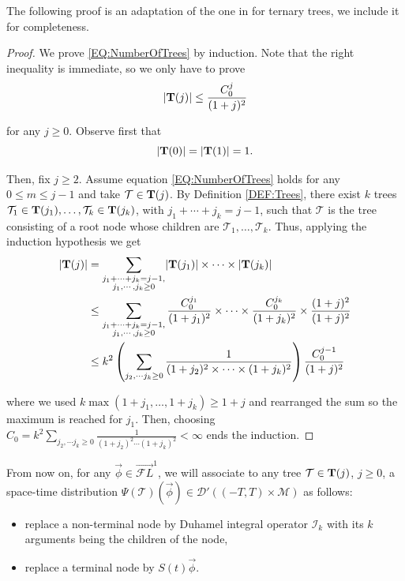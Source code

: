 \documentclass[letterpaper, 11pt,  reqno]{amsart}
\newcommand{\1}{\hspace{0.5mm}\text{I}\hspace{0.5mm}}
\newcommand{\I}{\mathcal{I}}
\newcommand{\noi}{\noindent}
\newcommand{\TT}{\mathcal{T}}
\newcommand{\BT}{{\bf T}}%
\newcommand{\M}{\mathcal{M}}
\newcommand{\FLv}{\overrightarrow{\mathcal{F}L}}
\numberwithin{equation}{section}
\numberwithin{theorem}{section}
\newcommand{\abs}[1]{\lvert#1\rvert}
\begin{document}
The following proof is an adaptation of the one in \cite{Oh} for ternary trees, we include it for completeness.

\begin{proof}
We prove \eqref{EQ:NumberOfTrees} by induction. Note that the right inequality is immediate, so we only have to prove
$$
\abs{\BT (j)} \leq \frac{C^j_0}{(1 + j)^2 }
$$

\noi for any $j \geq 0$. Observe first that
$$
\abs{\BT (0)} = \abs{\BT (1)} =1.
$$

\noi Then, fix $j \geq 2$. Assume equation \eqref{EQ:NumberOfTrees} holds for any $0 \leq m \leq j-1$ and take $\TT \in \BT(j)$. By Definition \ref{DEF:Trees}, there exist $k$ trees $\TT_1 \in \BT(j_1), \dots, \TT_k \in \BT(j_k )$, with $j_1 + \cdots + j_k = j -1$, such that $\TT$ is the tree consisting of a root node whose children are $\TT_1, \dots, \TT_k$. Thus, applying the induction hypothesis we get
\begin{align*}
\abs{\BT (j)} & = \sum_{\substack{j_1 + \cdots + j_k = j-1, \\ j_1, \cdots, j_k \geq 0}} \abs{\BT (j_1)} \times \cdots \times \abs{\BT (j_k)} \\
	& \leq \sum_{\substack{j_1 + \cdots + j_k = j-1, \\ j_1, \cdots,  j_k \geq 0}} \frac{C^{j_1}_0}{(1 + j_1)^2 } \times \cdots \times \frac{C^{j_k}_0}{(1 + j_k )^2 } \times \frac{(1+j)^2}{(1+j)^2} \\ 
	& \leq  k^2 \left( \sum_{j_2, \cdots j_k \geq 0} \frac{1}{(1 + j_2)^2 \times \cdots \times (1 + j_k )^2 } \right)  \frac{C^{j-1}_0}{(1 + j)^2 }
\end{align*}

\noi where we used $k \max \left( 1+ j_1 , \dots, 1 + j_k \right) \geq 1+j$ and rearranged the sum so the maximum is reached for $j_1$. Then, choosing $C_0 =  k^2 \sum_{j_2, \cdots j_k \geq 0} \frac{1}{(1 + j_2)^2 \cdots (1 + j_k )^2 } < \infty$ ends the induction.

\end{proof}


From now on, for any $\vec{\phi} \in \FLv^1$, we will associate to any tree $\TT \in \BT (j)$, $j \geq 0$, a space-time distribution $\Psi (\TT) (\vec{\phi}) \in \mathcal{D}' \left( (-T,T) \times \M \right)$ as follows:
\begin{itemize}
	\item replace a non-terminal node by Duhamel integral operator $\I_k$ with its $k$ arguments being the children of the node,
	\item replace a terminal node by $S(t) \vec{\phi}$.
\end{itemize}
\end{document}
